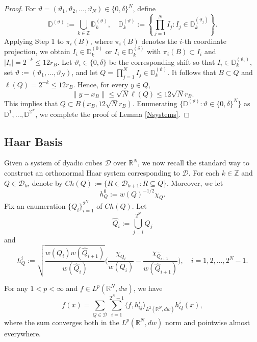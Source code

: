 \documentclass[12pt]{amsart}
\begin{document}
\begin{proof}
For $\vartheta=(\vartheta_1,\vartheta_2,\ldots,\vartheta_N)\in\{0,\delta\}^N$, define
$$\mathbb{D}^{(\vartheta)}:=\bigcup_{k\in\mathbb{Z}}\mathbb{D}_k^{(\vartheta)},\quad \mathbb{D}_k^{(\vartheta)}:=\left\{\prod_{j=1}^N I_j: I_j\in \mathbb{D}_k^{(\vartheta_j)}\right\}.$$
Applying Step 1 to $\pi_i(B)$, where $\pi_i(B)$ denotes the $i$-th coordinate projection, we obtain $I_i\in\mathbb{D}_k^{(0)}$ or $I_i\in\mathbb{D}_k^{(\delta)}$ with $\pi_i(B)\subset I_i$ and $|I_i|=2^{-k}\leq 12 r_B$. Let $\vartheta_i\in\{0,\delta\}$
be the corresponding shift so that $I_i\in\mathbb D_k^{(\vartheta_i)}$, set $\vartheta:=(\vartheta_1,\ldots,\vartheta_N)$, and let $Q=\prod_{j=1}^NI_j\in\mathbb{D}_k^{(\vartheta)}$. It follows that $B\subset Q$ and $\ell(Q)=2^{-k}\leq 12r_B$. Hence, for every $y\in Q$,
$$\|y-x_B\|\leq \sqrt{N}\ell(Q)\leq 12\sqrt{N}r_B.$$
This implies that $Q\subset B(x_B,12\sqrt{N}r_B)$. Enumerating $\big\{\mathbb D^{(\vartheta)}:\vartheta\in\{0,\delta\}^N\big\}$ as
$\mathbb D^1,\ldots,\mathbb D^{2^N}$, we complete the proof of Lemma \ref{Nsystems}.
\end{proof}





\subsection{Haar Basis}\label{HaarSection}



Given a system of dyadic cubes $\mathscr{D}$ over $\mathbb{R}^N$, we now recall the standard way to construct an orthonormal Haar system corresponding to $\mathscr{D}$. For each $k\in\mathbb{Z}$ and $Q\in\mathscr{D}_k$, denote by $Ch(Q):=\{R\in\mathscr{D}_{k+1}:R\subseteq Q\}$. Moreover,  we let
$$h_Q^0:=w(Q)^{-1/2}\chi_Q.$$
Fix an enumeration $\{Q_i\}_{i=1}^{2^N}$ of $Ch(Q)$. Let
$$\hat{Q}_i:=\bigcup_{j=i}^{2^N}Q_j$$
and
$$h_Q^i:=\sqrt{\frac{w(Q_i)w(\hat{Q}_{i+1})}{w(\hat{Q}_i)}}\Bigg(\frac{\chi_{Q_i}}{w(Q_i)}-\frac{\chi_{\hat{Q}_{i+1}}}{w(\hat{Q}_{i+1})}\Bigg),\quad i=1,2,\ldots,2^N-1.$$


\begin{lemma}\label{Haarexpansion}
For any $1<p<\infty$ and $f\in
    L^p(\mathbb{R}^N,dw)$, we have
    \[
        f(x)
        =  \sum_{Q\in\mathscr{D}}\sum_{i=1}^{2^N-1}
            \langle f,h^{i}_{Q}\rangle_{L^2(\mathbb{R}^N,dw)} h^{i}_{Q}(x), %
    \]
    where the sum converges both in the
    $L^p(\mathbb{R}^N,dw)$ norm and pointwise almost everywhere.
 \end{lemma}
\end{document}
